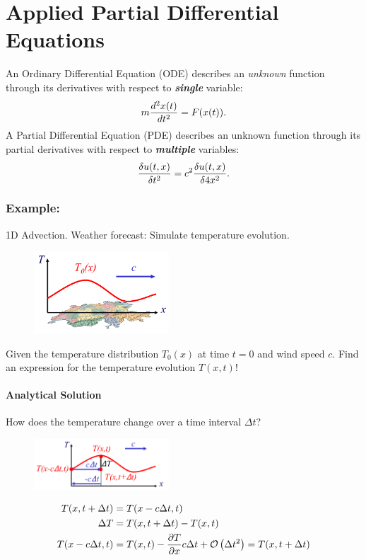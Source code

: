 \part{Applied Partial Differential Equations}

\begin{multicols}{2}
An Ordinary Differential Equation (ODE) describes an \emph{unknown} function through its derivatives with respect to \emph{\textbf{single}} variable:
\begin{align*}
	m {d^2 x(t) \over d t^2} = F(x(t)).
\end{align*}
 A Partial Differential Equation (PDE) describes an unknown function through its partial derivatives with respect to \emph{\textbf{multiple}} variables:
 \begin{align*}
 	{\delta u(t, x) \over \delta t^2} = c^2 {\delta u(t, x) \over \delta4 x^2}.
 \end{align*}

\section{Example:} 1D Advection. Weather forecast: Simulate temperature evolution.
\begin{figure}[H]
	\centering
	\includegraphics[width=0.45\textwidth]{img/03_weather}
\end{figure}
Given the temperature distribution $T_0(x)$ at time $t=0$ and wind speed $c$. Find an expression for the temperature evolution $T(x,t)$!

\subsection{Analytical Solution}

How does the temperature change over a time interval $\Delta  t$?
\begin{figure}[H]
	\centering
	\includegraphics[width=0.45\textwidth]{img/03_1D_advection}
\end{figure}
\begin{align*}
	T(x, t+\Delta t) &= T(x-c\Delta t, t) \\
	\Delta T &= T(x,t+\Delta t) - T(x,t)\\
	T(x-c\Delta t, t) &= T(x,t) - {\partial T \over \partial x} c \Delta t + \mathcal O\left(\Delta t^2\right) = T(x, t+\Delta t)
\end{align*}


\end{multicols}
